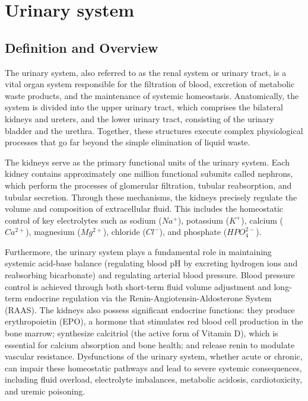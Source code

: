\chapter{Urinary system}

\section*{Definition and Overview}
The urinary system, also referred to as the renal system or urinary tract, is a vital organ system responsible for the filtration of blood, excretion of metabolic waste products, and the maintenance of systemic homeostasis. Anatomically, the system is divided into the upper urinary tract, which comprises the bilateral kidneys and ureters, and the lower urinary tract, consisting of the urinary bladder and the urethra. Together, these structures execute complex physiological processes that go far beyond the simple elimination of liquid waste.

The kidneys serve as the primary functional units of the urinary system. Each kidney contains approximately one million functional subunits called nephrons, which perform the processes of glomerular filtration, tubular reabsorption, and tubular secretion. Through these mechanisms, the kidneys precisely regulate the volume and composition of extracellular fluid. This includes the homeostatic control of key electrolytes such as sodium ($Na^+$), potassium ($K^+$), calcium ($Ca^{2+}$), magnesium ($Mg^{2+}$), chloride ($Cl^-$), and phosphate ($HPO_4^{2-}$).

Furthermore, the urinary system plays a fundamental role in maintaining systemic acid-base balance (regulating blood pH by excreting hydrogen ions and reabsorbing bicarbonate) and regulating arterial blood pressure. Blood pressure control is achieved through both short-term fluid volume adjustment and long-term endocrine regulation via the Renin-Angiotensin-Aldosterone System (RAAS). The kidneys also possess significant endocrine functions: they produce erythropoietin (EPO), a hormone that stimulates red blood cell production in the bone marrow; synthesize calcitriol (the active form of Vitamin D), which is essential for calcium absorption and bone health; and release renin to modulate vascular resistance. Dysfunctions of the urinary system, whether acute or chronic, can impair these homeostatic pathways and lead to severe systemic consequences, including fluid overload, electrolyte imbalances, metabolic acidosis, cardiotoxicity, and uremic poisoning.


